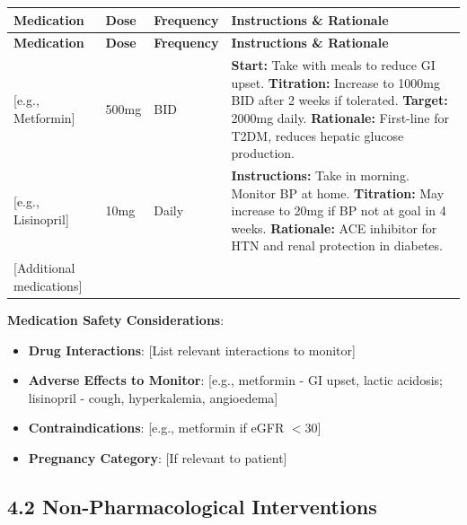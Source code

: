 \documentclass[11pt,letterpaper]{article}
\begin{document}
\begin{longtable}{|p{3cm}|p{2cm}|p{2cm}|p{6.5cm}|}
\hline
\textbf{Medication} & \textbf{Dose} & \textbf{Frequency} & \textbf{Instructions \& Rationale} \\ \hline
\endfirsthead
\hline
\textbf{Medication} & \textbf{Dose} & \textbf{Frequency} & \textbf{Instructions \& Rationale} \\ \hline
\endhead

[e.g., Metformin] & 500mg & BID & \textbf{Start:} Take with meals to reduce GI upset. \textbf{Titration:} Increase to 1000mg BID after 2 weeks if tolerated. \textbf{Target:} 2000mg daily. \textbf{Rationale:} First-line for T2DM, reduces hepatic glucose production. \\ \hline

[e.g., Lisinopril] & 10mg & Daily & \textbf{Instructions:} Take in morning. Monitor BP at home. \textbf{Titration:} May increase to 20mg if BP not at goal in 4 weeks. \textbf{Rationale:} ACE inhibitor for HTN and renal protection in diabetes. \\ \hline

[Additional medications] & & & \\ \hline
\end{longtable}

\textbf{Medication Safety Considerations}:
\begin{itemize}[leftmargin=*]
    \item \textbf{Drug Interactions}: [List relevant interactions to monitor]
    \item \textbf{Adverse Effects to Monitor}: [e.g., metformin - GI upset, lactic acidosis; lisinopril - cough, hyperkalemia, angioedema]
    \item \textbf{Contraindications}: [e.g., metformin if eGFR $<$30]
    \item \textbf{Pregnancy Category}: [If relevant to patient]
\end{itemize}

\subsection*{4.2 Non-Pharmacological Interventions}
\end{document}
